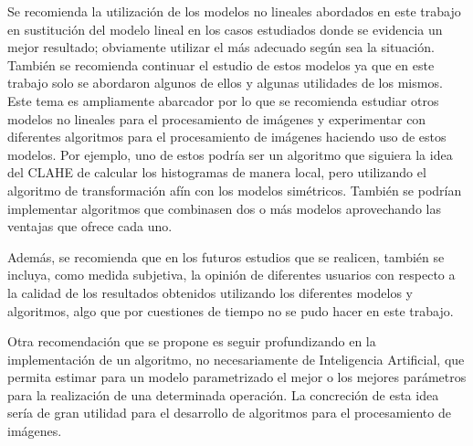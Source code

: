 \begin{recomendations}
    Se recomienda la utilizaci\'on de los modelos no lineales abordados en este trabajo en sustituci\'on del modelo lineal en los casos estudiados donde se evidencia un mejor resultado; obviamente utilizar el m\'as adecuado seg\'un sea la situaci\'on. Tambi\'en se recomienda continuar el estudio de estos modelos ya que en este trabajo solo se abordaron algunos de ellos y algunas utilidades de los mismos. Este tema es ampliamente abarcador por lo que se recomienda estudiar otros modelos no lineales para el procesamiento de im\'agenes y experimentar con diferentes algoritmos para el procesamiento de im\'agenes haciendo uso de estos modelos. Por ejemplo, uno de estos podr\'ia ser un algoritmo que siguiera la idea del CLAHE de calcular los histogramas de manera local, pero utilizando el algoritmo de transformaci\'on af\'in con los modelos sim\'etricos. Tambi\'en se podr\'ian implementar algoritmos que combinasen dos o m\'as modelos aprovechando las ventajas que ofrece cada uno.
    
    Adem\'as, se recomienda que en los futuros estudios que se realicen, tambi\'en se incluya, como medida subjetiva, la opini\'on de diferentes usuarios con respecto a la calidad de los resultados obtenidos utilizando los diferentes modelos y algoritmos, algo que por cuestiones de tiempo no se pudo hacer en este trabajo.
    
    Otra recomendaci\'on que se propone es seguir profundizando en la implementaci\'on de un algoritmo, no necesariamente de Inteligencia Artificial, que permita estimar para un modelo parametrizado el mejor o los mejores par\'ametros para la realizaci\'on de una determinada operaci\'on. La concreci\'on de esta idea ser\'ia de gran utilidad para el desarrollo de algoritmos para el procesamiento de im\'agenes.
    
    
\end{recomendations}
